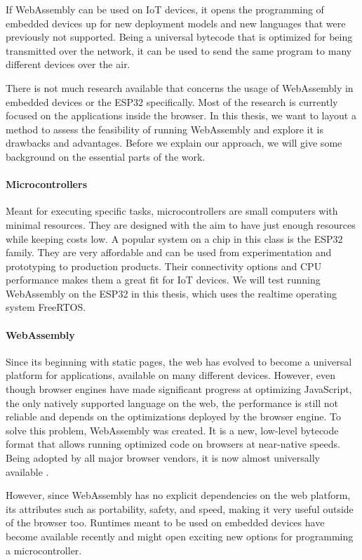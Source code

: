 If WebAssembly can be used on IoT devices, it opens the programming of embedded devices up for new deployment models and new languages that were previously not supported. Being a universal bytecode that is optimized for being transmitted over the network, it can be used to send the same program to many different devices over the air.

There is not much research available that concerns the usage of WebAssembly in embedded devices or the ESP32 specifically. Most of the research is currently focused on the applications inside the browser. In this thesis, we want to layout a method to assess the feasibility of running WebAssembly and explore it is drawbacks and advantages. Before we explain our approach, we will give some background on the essential parts of the work. 

\paragraph{Microcontrollers}
Meant for executing specific tasks, microcontrollers are small computers with minimal resources. They are designed with the aim to have just enough resources while keeping costs low. A popular system on a chip in this class is the ESP32 family. They are very affordable and can be used from experimentation and prototyping to production products. Their connectivity options and CPU performance makes them a great fit for IoT devices. We will test running WebAssembly on the ESP32 in this thesis, which uses the realtime operating system FreeRTOS.

\paragraph{WebAssembly}
Since its beginning with static pages, the web has evolved to become a universal platform for applications, available on many different devices. However, even though browser engines have made significant progress at optimizing JavaScript, the only natively supported language on the web, the performance is still not reliable and depends on the optimizations deployed by the browser engine. To solve this problem, WebAssembly was created. It is a new, low-level bytecode format that allows running optimized code on browsers at near-native speeds. Being adopted by all major browser vendors, it is now almost universally available \autocite{deveria_can_nodate}.

However, since WebAssembly has no explicit dependencies on the web platform, its attributes such as portability, safety, and speed, making it very useful outside of the browser too. Runtimes meant to be used on embedded devices have become available recently and might open exciting new options for programming a microcontroller.


